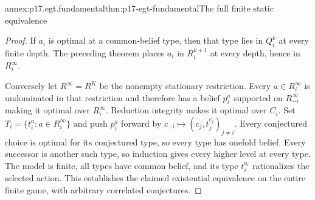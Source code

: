 \begin{annexitem}{annex:p17.egt.fundamental}{thm:p17-egt-fundamental}{The full finite static equivalence}
\begin{proof}
If \(a_i\) is optimal at a common-belief type, then that type
lies in \(Q_i^k\) at every finite depth. The preceding theorem
places \(a_i\) in \(R_i^{k+1}\) at every depth, hence in
\(R_i^\infty\).

Conversely let \(R^\infty=R^K\) be the nonempty stationary
restriction. Every \(a\in R_i^\infty\) is undominated in that
restriction and therefore has a belief \(p_i^a\) supported on
\(R_{-i}^\infty\) making it optimal over \(R_i^\infty\).
Reduction integrity makes it optimal over \(C_i\).
Set \(T_i=\{t_i^a:a\in R_i^\infty\}\) and push \(p_i^a\)
forward by \(c_{-i}\mapsto(c_j,t_j^{c_j})_{j\ne i}\).
Every conjectured choice is optimal for its conjectured type,
so every type has onefold belief. Every successor is another
such type, so induction gives every higher level at every type.
The model is finite, all types have common belief, and its
type \(t_i^{a_i}\) rationalizes the selected action.
This establishes the claimed existential equivalence on the
entire finite game, with arbitrary correlated conjectures.
\end{proof}
\end{annexitem}

